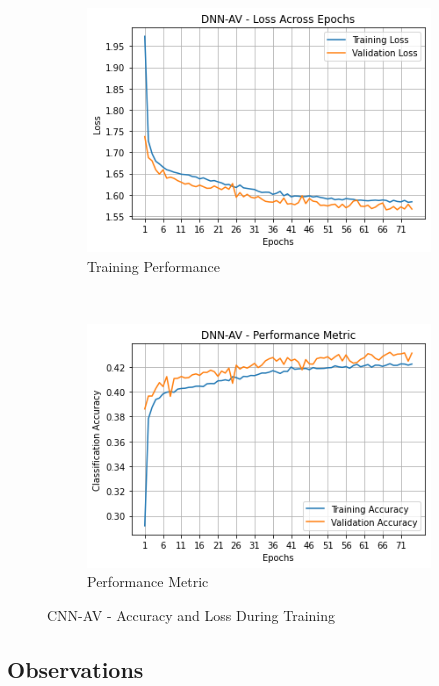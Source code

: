 \documentclass[journal,onecolumn]{IEEEtran}
\begin{document}
\begin{figure}[h]
    \centering
    \begin{subfigure}[b]{0.4\textwidth}
        \centering
        \includegraphics[scale=0.5]{dnnavPerf}
        \caption{Training Performance}
    \end{subfigure}%
    ~ 
    \begin{subfigure}[b]{0.4\textwidth}
        \centering
        \includegraphics[scale=0.5]{dnnavPerfMet}
        \caption{Performance Metric}
    \end{subfigure}
    \caption{CNN-AV - Accuracy and Loss During Training}
    \label{fig:performanceDNN}
\end{figure}

\subsection{Observations}
\end{document}
